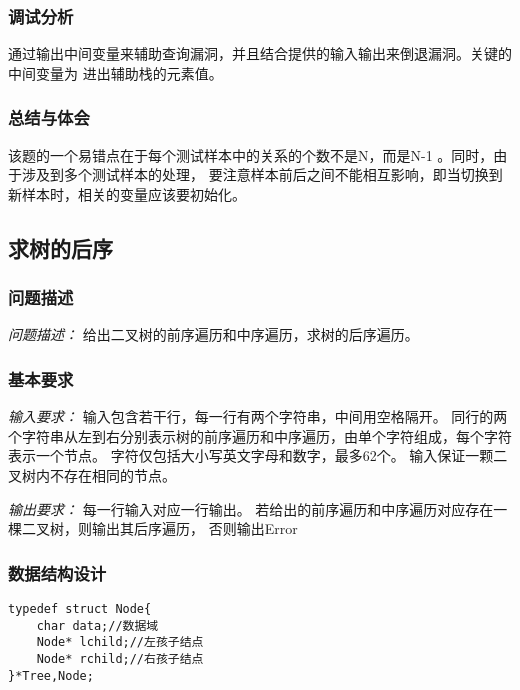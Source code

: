 \documentclass[a4paper,11pt]{article}%
\newenvironment{shadedquotation}
 {\begin{shaded*}
  \quoting[leftmargin=0pt, vskip=0pt]
 }
 {\endquoting
 \end{shaded*}
}
\begin{document}
\subsubsection{调试分析}
通过输出中间变量来辅助查询漏洞，并且结合提供的输入输出来倒退漏洞。关键的中间变量为
进出辅助栈的元素值。
\subsubsection{总结与体会}
该题的一个易错点在于每个测试样本中的关系的个数不是N，而是N-1 。同时，由于涉及到多个测试样本的处理，
要注意样本前后之间不能相互影响，即当切换到新样本时，相关的变量应该要初始化。
\subsection{求树的后序}
\subsubsection{问题描述}
\begin{shadedquotation}
    \emph{问题描述：}
    给出二叉树的前序遍历和中序遍历，求树的后序遍历。
\end{shadedquotation}
\subsubsection{基本要求}
\begin{shadedquotation}
    \emph{输入要求：}
    输入包含若干行，每一行有两个字符串，中间用空格隔开。
    同行的两个字符串从左到右分别表示树的前序遍历和中序遍历，由单个字符组成，每个字符表示一个节点。
    字符仅包括大小写英文字母和数字，最多62个。
    输入保证一颗二叉树内不存在相同的节点。
\end{shadedquotation}
\begin{shadedquotation}
    \emph{输出要求：}
    每一行输入对应一行输出。
若给出的前序遍历和中序遍历对应存在一棵二叉树，则输出其后序遍历，
否则输出Error
\end{shadedquotation}
\subsubsection{数据结构设计}
\begin{lstlisting}[language={[ANSI]C},keywordstyle=\color{blue!70},commentstyle=\color{red!50!green!50!blue!50},frame=shadowbox,
				rulesepcolor=\color{red!20!green!20!blue!20}]
typedef struct Node{
    char data;//数据域
    Node* lchild;//左孩子结点
    Node* rchild;//右孩子结点
}*Tree,Node;
\end{lstlisting}
\end{document}
